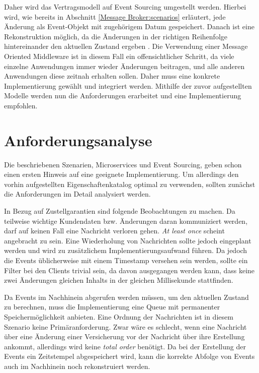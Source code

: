 Daher wird das Vertragsmodell auf Event Sourcing umgestellt werden.
Hierbei wird, wie bereits in Abschnitt \ref{Message Broker:scenarios} erläutert,
jede Änderung als Event-Objekt mit zugehörigem Datum gespeichert.
Danach ist eine Rekonstruktion möglich, da die Änderungen in der richtigen
Reihenfolge hintereinander den aktuellen Zustand ergeben \cite{kleppmann2017designing}. Die Verwendung einer
Message Oriented Middleware ist in diesem Fall ein offensichtlicher Schritt,
da viele einzelne Anwendungen immer wieder Änderungen beitragen, und alle
anderen Anwendungen diese zeitnah erhalten sollen. Daher muss eine konkrete
Implementierung gewählt und integriert werden. Mithilfe der zuvor aufgestellten
Modelle werden nun die Anforderungen erarbeitet und eine Implementierung
empfohlen.

\section{Anforderungsanalyse}
Die beschriebenen Szenarien, Microservices und Event Sourcing, geben schon
einen ersten Hinweis auf eine geeignete Implementierung.
Um allerdings den vorhin aufgestellten Eigenschaftenkatalog optimal zu
verwenden, sollten zunächst die Anforderungen im Detail analysiert werden.

In Bezug auf Zustellgarantien sind folgende Beobachtungen zu machen. Da teilweise
wichtige Kundendaten bzw. Änderungen daran kommuniziert werden, darf auf keinen
Fall eine Nachricht verloren gehen. \textit{At least once} scheint angebracht zu
sein. Eine Wiederholung von Nachrichten sollte jedoch eingeplant werden und wird zu
zusätzlichem Implementierungsaufwand führen. Da jedoch die Events üblicherweise
mit einem Timestamp versehen sein werden, sollte ein Filter bei den Clients
trivial sein, da davon ausgegangen werden kann, dass keine zwei Änderungen
gleichen Inhalts in der gleichen Millisekunde stattfinden.

Da Events im Nachhinein abgerufen werden müssen, um den aktuellen Zustand zu
berechnen, muss die Implementierung eine Queue mit permanenter
Speichermöglichkeit anbieten.
Eine Ordnung der Nachrichten ist in diesem Szenario keine Primäranforderung. Zwar
wäre es schlecht, wenn eine Nachricht über eine Änderung einer Versicherung vor der
Nachricht über ihre Erstellung ankommt, allerdings wird keine \textit{total order}
benötigt. Da bei der Erstellung der Events ein Zeitstempel abgespeichert wird,
kann die korrekte Abfolge von Events auch im Nachhinein noch rekonstruiert werden.

